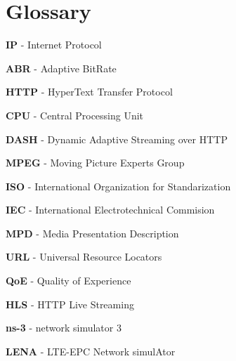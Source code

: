 \cleardoublepage
{}
\chapter*{Glossary}


\textbf{IP} - Internet Protocol

\textbf{ABR} - Adaptive BitRate

\textbf{HTTP} - HyperText Transfer Protocol

\textbf{CPU} - Central Processing Unit

\textbf{DASH} - Dynamic Adaptive Streaming over HTTP

\textbf{MPEG} - Moving Picture Experts Group

\textbf{ISO} - International Organization for Standarization

\textbf{IEC} - International Electrotechnical Commision

\textbf{MPD} - Media Presentation Description

\textbf{URL} - Universal Resource Locators

\textbf{QoE} - Quality of Experience

\textbf{HLS} - HTTP Live Streaming

\textbf{ns-3} - network simulator 3

\textbf{LENA} - LTE-EPC Network simulAtor


\cleardoublepage
